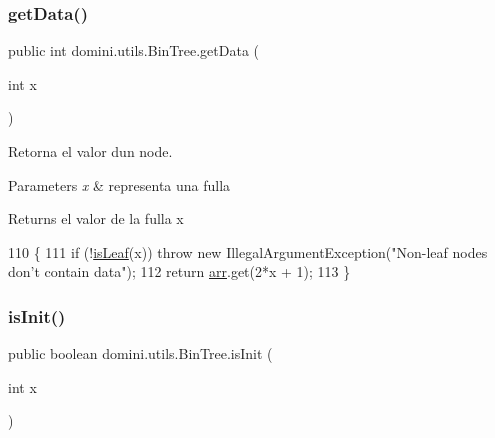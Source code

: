 \subsubsection{\texorpdfstring{get\+Data()}{getData()}}
{\footnotesize\ttfamily public int domini.\+utils.\+Bin\+Tree.\+get\+Data (\begin{DoxyParamCaption}\item[{int}]{x }\end{DoxyParamCaption})\hspace{0.3cm}{\ttfamily [inline]}}



Retorna el valor d\textquotesingle{}un node. 


\begin{DoxyParams}{Parameters}
{\em x} & representa una fulla \\
\hline
\end{DoxyParams}
\begin{DoxyReturn}{Returns}
el valor de la fulla x 
\end{DoxyReturn}

\begin{DoxyCode}
110                               \{
111         \textcolor{keywordflow}{if} (!\hyperlink{classdomini_1_1utils_1_1BinTree_a37030e961f5613a5c74984ac002d965b}{isLeaf}(x)) \textcolor{keywordflow}{throw} \textcolor{keyword}{new} IllegalArgumentException(\textcolor{stringliteral}{"Non-leaf nodes don't contain data"});
112         \textcolor{keywordflow}{return} \hyperlink{classdomini_1_1utils_1_1BinTree_a357bcbcf07ba7fcb99d11b237d189e65}{arr}.get(2*x + 1);
113     \}
\end{DoxyCode}
\mbox{\label{classdomini_1_1utils_1_1BinTree_aefcc4df5059f9893eba9998cb267eced}} 
\subsubsection{\texorpdfstring{is\+Init()}{isInit()}}
{\footnotesize\ttfamily public boolean domini.\+utils.\+Bin\+Tree.\+is\+Init (\begin{DoxyParamCaption}\item[{int}]{x }\end{DoxyParamCaption})\hspace{0.3cm}{\ttfamily [inline]}}



